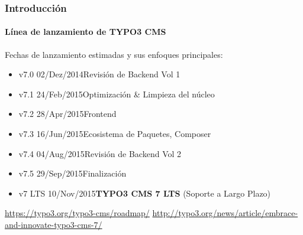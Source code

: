 \begin{frame}[fragile]
	\frametitle{Introducción}
	\framesubtitle{Línea de lanzamiento de TYPO3 CMS}

	Fechas de lanzamiento estimadas y sus enfoques principales:

	\begin{itemize}
		\item v7.0 \tabto{1.1cm}02/Dez/2014\tabto{3.4cm}Revisión de Backend Vol 1
		\item v7.1 \tabto{1.1cm}24/Feb/2015\tabto{3.4cm}Optimización \& Limpieza del núcleo
		\item v7.2 \tabto{1.1cm}28/Apr/2015\tabto{3.4cm}Frontend
		\item v7.3 \tabto{1.1cm}16/Jun/2015\tabto{3.4cm}Ecosistema de Paquetes, Composer
		\item v7.4 \tabto{1.1cm}04/Aug/2015\tabto{3.4cm}Revisión de Backend Vol 2
		\item v7.5 \tabto{1.1cm}29/Sep/2015\tabto{3.4cm}Finalización

		\item
			\begingroup
				\color{typo3orange}
					v7 LTS \tabto{1.1cm}10/Nov/2015\tabto{3.4cm}\textbf{TYPO3 CMS 7 LTS} (Soporte a Largo Plazo)
			\endgroup

	\end{itemize}

	\smaller
		\url{https://typo3.org/typo3-cms/roadmap/}\newline
		\url{http://typo3.org/news/article/embrace-and-innovate-typo3-cms-7/}
	\normalsize

\end{frame}

